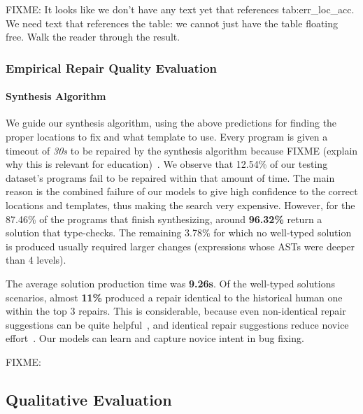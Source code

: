 FIXME: It looks like we don't have any text yet that references
tab:err\_loc\_acc. We need text that references the table: we cannot just
have the table floating free. Walk the reader through the result.

\subsubsection{Empirical Repair Quality Evaluation}
\label{subsubsec:man_rep_qual_eval}

\paragraph{Synthesis Algorithm}
We guide our synthesis algorithm, using the above predictions for finding the
proper locations to fix and what template to use. Every program is given a timeout of
\emph{30s} to be repaired by the synthesis algorithm because
FIXME (explain why this is relevant for education)~\cite{FIXME}. We observe that
12.54\% of our testing dataset's programs fail to be repaired within
that amount of time. The main reason is the combined failure of our
models to give high confidence to the correct locations and templates, thus
making the search very expensive. However, for the 87.46\% of the programs that
finish synthesizing, around \textbf{96.32\%} return a solution that
type-checks. The remaining 3.78\% for which no well-typed solution is
produced usually required larger changes (\ie expressions whose ASTs were
deeper than 4 levels).

The average solution production time
was \textbf{9.26s}. Of the well-typed solutions scenarios, almost
\textbf{11\%} produced a repair identical to the historical human one
within the top 3 repairs. This is considerable, because even non-identical
repair suggestions can be quite helpful~\cite{FIXME}, and identical
repair suggestions reduce novice effort~\cite{FIXME}.
Our models can learn and capture novice intent in bug fixing.

FIXME: 


\subsection{Qualitative Evaluation}
\label{subsec:quan_eval}

